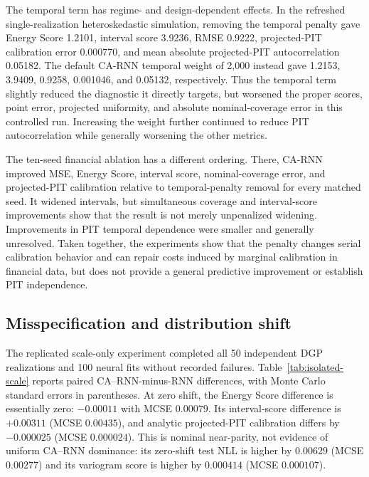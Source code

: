 \documentclass[11pt]{article}
\begin{document}
The temporal term has regime- and design-dependent effects. In the refreshed
single-realization heteroskedastic simulation, removing the temporal penalty
gave Energy Score 1.2101, interval score 3.9236, RMSE 0.9222, projected-PIT
calibration error 0.000770, and mean absolute projected-PIT autocorrelation
0.05182. The default CA-RNN temporal weight of 2,000 instead gave 1.2153,
3.9409, 0.9258, 0.001046, and 0.05132, respectively. Thus the temporal term
slightly reduced the diagnostic it directly targets, but worsened the proper
scores, point error, projected uniformity, and absolute nominal-coverage error
in this controlled run. Increasing the weight further continued to reduce PIT
autocorrelation while generally worsening the other metrics.

The ten-seed financial ablation has a different ordering. There, CA-RNN improved
MSE, Energy Score, interval score, nominal-coverage error, and projected-PIT
calibration relative to temporal-penalty removal for every matched seed. It
widened intervals, but simultaneous coverage and interval-score improvements
show that the result is not merely unpenalized widening. Improvements in PIT
temporal dependence were smaller and generally unresolved. Taken together, the
experiments show that the penalty changes serial calibration behavior and can
repair costs induced by marginal calibration in financial data, but does not
provide a general predictive improvement or establish PIT independence.

\subsection{Misspecification and distribution shift}

The replicated scale-only experiment completed all 50 independent DGP
realizations and 100 neural fits without recorded failures. Table~\ref{tab:isolated-scale}
reports paired CA--RNN-minus-RNN differences, with Monte Carlo standard errors
in parentheses. At zero shift, the Energy Score difference is essentially zero:
$-0.00011$ with MCSE $0.00079$. Its interval-score difference is $+0.00311$
(MCSE $0.00435$), and analytic projected-PIT calibration differs by
$-0.000025$ (MCSE $0.000024$). This is nominal near-parity, not evidence of
uniform CA--RNN dominance: its zero-shift test NLL is higher by $0.00629$
(MCSE $0.00277$) and its variogram score is higher by $0.000414$
(MCSE $0.000107$).
\end{document}
